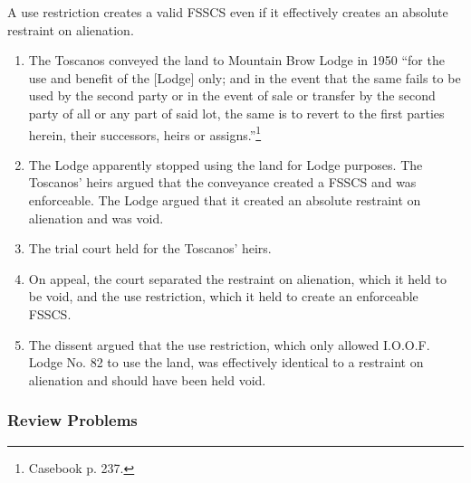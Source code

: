 A use restriction creates a valid FSSCS even if it effectively creates an 
absolute restraint on alienation.

\begin{enumerate}
    \item The Toscanos conveyed the land to Mountain Brow Lodge in 1950 ``for 
    the use and benefit of the [Lodge] only; and in the event that the same 
    fails to be used by the second party or in the event of sale or transfer 
    by the second party of all or any part of said lot, the same is to revert 
    to the first parties herein, their successors, heirs or 
    assigns.''\footnote{Casebook p. 237.}
    \item The Lodge apparently stopped using the land for Lodge purposes. The 
    Toscanos' heirs argued that the conveyance created a FSSCS and was 
    enforceable. The Lodge argued that it created an absolute restraint on 
    alienation and was void.
    \item The trial court held for the Toscanos' heirs.
    \item On appeal, the court separated the restraint on alienation, which it 
    held to be void, and the use restriction, which it held to create an 
    enforceable FSSCS.
    \item The dissent argued that the use restriction, which only allowed 
    I.O.O.F. Lodge No. 82 to use the land, was effectively identical to a 
    restraint on alienation and should have been held void.
\end{enumerate}

\subsubsection{Review Problems}

